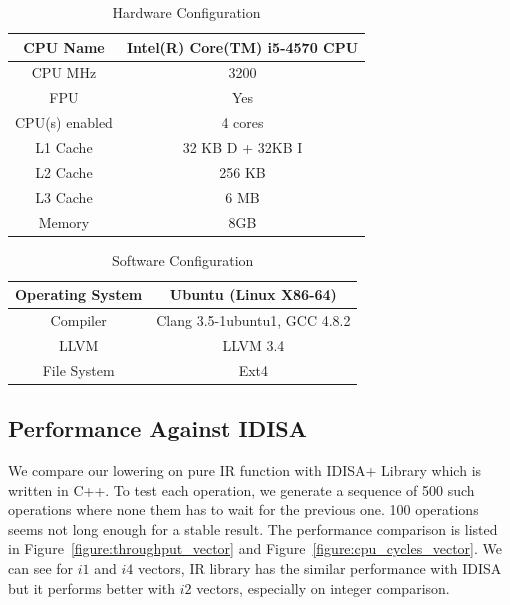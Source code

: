 \begin{table}[h]
\centering
\begin{tabular}{|c|c|}
\hline
CPU Name       & Intel(R) Core(TM) i5-4570 CPU \\ \hline
CPU MHz        & 3200                          \\ \hline
FPU            & Yes                           \\ \hline
CPU(s) enabled & 4 cores                       \\ \hline
L1 Cache       & 32 KB D + 32KB I              \\ \hline
L2 Cache       & 256 KB                        \\ \hline
L3 Cache       & 6 MB                          \\ \hline
Memory         & 8GB                           \\ \hline
\end{tabular}
\caption{Hardware Configuration}
\label{table:hardware_config}
\end{table}

\begin{table}[h]
\centering
\begin{tabular}{|c|c|}
\hline
Operating System & Ubuntu (Linux X86-64)         \\ \hline
Compiler         & Clang 3.5-1ubuntu1, GCC 4.8.2 \\ \hline
LLVM             & LLVM 3.4                      \\ \hline
File System      & Ext4                          \\ \hline
\end{tabular}
\caption{Software Configuration}
\label{table:software_config}
\end{table}

\subsection{Performance Against IDISA}
We compare our lowering on pure IR function with IDISA+ Library \cite{hua_idisa} which is written in C++. To test each operation, we generate a sequence of 500 such operations where none them has to wait for the previous one. 100 operations seems not long enough for a stable result. The performance comparison is listed in Figure~\ref{figure:throughput_vector} and Figure~\ref{figure:cpu_cycles_vector}. We can see for $i1$ and $i4$ vectors, IR library has the similar performance with IDISA but it performs better with $i2$ vectors, especially on integer comparison.

